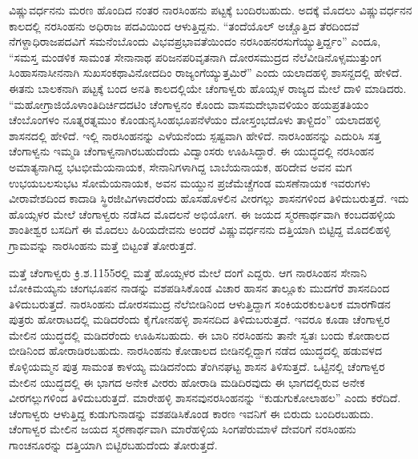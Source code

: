 ವಿಷ್ಣುವರ್ಧನನು ಮರಣ ಹೊಂದಿದ ನಂತರ ನಾರಸಿಂಹನು ಪಟ್ಟಕ್ಕೆ ಬಂದಿರಬಹುದು. ಅದಕ್ಕೆ ಮೊದಲು ವಿಷ್ಣುವರ್ಧನನ ಕಾಲದಲ್ಲಿ ನರಸಿಂಹನು ಅಧಿರಾಜ ಪದವಿಯಿಂದ ಆಳುತ್ತಿದ್ದನು. “ತಂದೆಯೊಲ್​ ಅಚ್ಚೊತ್ತಿದ ತೆರದಿಂದವೆ ನೆಗಳ್ದಾಧಿರಾಜಪದವಿಗೆ ಸಮನೆಂಬೊಂದು ವಿಭವಪ್ರಭಾವತೆಯಿಂದಂ ನರಸಿಂಹನರಸುಗೆಯ್ಯುತ್ತಿರ್ದ್ದಂ” ಎಂದೂ, “ಸಮಸ್ತ ಮಂಡಳಿಕ ಸಾಮಂತ ಸೇನಾನಾಥ ಪರಿಜನಪರಿವೃತನಾಗಿ ದೋರಸಮುದ್ರದ ನೆಲೆವೀಡಿನೊಳ್ಸಮುತ್ತುಂಗ ಸಿಂಹಾಸನಾಸೀನನಾಗಿ ಸುಖಸಂಕಥಾ\break ವಿನೋದದಿಂ ರಾಜ್ಯಂಗೆಯ್ಯುತ್ತಮಿರೆ” ಎಂದು ಯಲಾದಹಳ್ಳಿ ಶಾಸನ್ದದಲ್ಲಿ ಹೇಳಿದೆ. ಈತನು ಬಾಲಕನಾಗಿ ಪಟ್ಟಕ್ಕೆ ಬಂದ ಅನತಿ ಕಾಲದಲ್ಲಿಯೇ ಚೆಂಗಾಳ್ವರು ಹೊಯ್ಸಳ ರಾಜ್ಯದ ಮೇಲೆ ದಾಳಿ ಮಾಡಿದರು. “ಮಹೋಗ್ರಾಜಿಯೊಳಾಂತಿದಿರ್ಚಿದದಟಿಂ ಚೆಂಗಾಳ್ವನಂ ಕೊಂದು ವಾಸಮದೇಭಾವಳಿಯಂ ಹಯಪ್ರತತಿಯಂ ಚೆಂಬೊಂಗಳಂ ನೂತ್ನರತ್ನಮುಂ ಕೊಂಡು\break ನೃಸಿಂಹಭೂಪನೆಳೆಯಂ ದೋಸ್ತಂಭದೊಳು ತಾಳ್ದಿದಂ” ಯಲಾದಹಳ್ಳಿ ಶಾಸನದಲ್ಲಿ ಹೇಳಿದೆ. ಇಲ್ಲಿ ನಾರಸಿಂಹನನ್ನು ಎಳೆಯನೆಂದು ಸ್ಪಷ್ಟವಾಗಿ ಹೇಳಿದೆ. ನಾರಸಿಂಹನನ್ನು ಎದುರಿಸಿ ಸತ್ತ ಚೆಂಗಾಳ್ವನು ಇಮ್ಮಡಿ ಚೆಂಗಾಳ್ವನಾಗಿರಬಹುದೆಂದು ವಿದ್ವಾಂಸರು ಊಹಿಸಿದ್ದಾರೆ. ಈ ಯುದ್ಧದಲ್ಲಿ ನರಸಿಂಹನ ಅಮಾತ್ಯನಾಗಿದ್ದ ಭಟಭೀಮೆಯನಾಯಕ, ಸೇನಾನಿಗಳಾಗಿದ್ದ ಬಾಬೆಯನಾಯಕ, ಹರಿದೇವ ಅವನ ಮಗ ಉಭಯಬಲಸುಭಟ ಸೋಮೆಯನಾಯಕ, ಅವನ ಮಯ್ದುನ ಪ್ರಜೆಮೆಚ್ಚೆಗಂಡ ಮಸಣೆನಾಯಕ ಇವರುಗಳು ವೀರಾವೇಶದಿಂದ ಕಾದಾಡಿ ಸ್ಥಿರಜೀವಿಗಳಾದರೆಂದು ಹೊಸಹೊಳಲಿನ ವೀರಗಲ್ಲು ಶಾಸನಗಳಿಂದ ತಿಳಿದುಬರುತ್ತದೆ. ಇದು ಹೊಯ್ಸಳರ ಮೇಲೆ ಚೆಂಗಾಳ್ವರು ನಡೆಸಿದ ಮೊದಲನೆ ಅಭಿಯೋಗ. ಈ ಜಯದ ಸ್ಮರಣಾರ್ಥವಾಗಿ ಕಂಬದಹಳ್ಳಿಯ ಶಾಂತೀಶ್ವರ ಬಸದಿಗೆ ಈ ಮೊದಲು ಹಿರಿಯದೇವನು ಅಂದರೆ ವಿಷ್ಣುವರ್ಧನನು ದತ್ತಿಯಾಗಿ ಬಿಟ್ಟಿದ್ದ ಮೊದಲಿಹಳ್ಳಿ ಗ್ರಾಮವನ್ನು ನಾರಸಿಂಹನು ಮತ್ತೆ ಬಿಟ್ಟಂತೆ ತೋರುತ್ತದೆ. 

ಮತ್ತೆ ಚೆಂಗಾಳ್ವರು ಕ್ರಿ.ಶ.1155ರಲ್ಲಿ ಮತ್ತೆ ಹೊಯ್ಸಳರ ಮೇಲೆ ದಂಗೆ ಎದ್ದರು. ಆಗ ನಾರಸಿಂಹನ ಸೇನಾನಿ ಬೋಕಿಮಯ್ಯನು ಚಂಗಭೂಪನ ನಾಡನ್ನು ವಶಪಡಿಸಿಕೊಂಡ ವಿಚಾರ ಹಾಸನ ತಾಲ್ಲೂಕು ಮುದಗೆರೆ ಶಾಸನದಿಂದ ತಿಳಿದುಬರುತ್ತದೆ. ನಾರಸಿಂಹನು ದೋರಸಮುದ್ರ ನೆಲೆಬೀಡಿನಿಂದ ಆಳುತ್ತಿದ್ದಾಗ ಸಂಕಿಯರಕುಲತಿಲಕ ಮಾರಗೌಡನ ಪುತ್ರರು ಹೋರಾಟದಲ್ಲಿ ಮಡಿದರೆಂದು ಕೈಗೋನಹಳ್ಳಿ ಶಾಸನದಿದ ತಿಳಿದುಬರುತ್ತದೆ. ಇವರೂ ಕೂಡಾ ಚೆಂಗಾಳ್ವರ ಮೇಲಿನ ಯುದ್ಧದಲ್ಲಿ ಮಡಿದರೆಂದು ಊಹಿಸಬಹುದು. ಈ ಬಾರಿ ನರಸಿಂಹನು ತಾನೇ ಸ್ವತಃ ಬಂದು ಕೋಡಾಲದ ಬೀಡಿನಿಂದ ಹೋರಾಡಿರಬಹುದು. ನಾರಸಿಂಹನು ಕೋಡಾಲದ ಬೀಡಿನಲ್ಲಿದ್ದಾಗ ನಡೆದ ಯುದ್ಧದಲ್ಲಿ ಹಡುವಳದ ಕೊಳ್ಳಿಯಮ್ಮನ ಪುತ್ರ ಸಾಮಂತ ಕಾಳಯ್ಯ ಮಡಿದನೆಂದು ತೆಂಗಿನಘಟ್ಟ ಶಾಸನ ತಿಳಿಸುತ್ತದೆ. ಒಟ್ಟಿನಲ್ಲಿ ಚೆಂಗಾಳ್ವರ ಮೇಲಿನ ಯುದ್ಧದಲ್ಲಿ ಈ ಭಾಗದ ಅನೇಕ ವೀರರು ಹೋರಾಡಿ ಮಡಿದಿರವುದು ಈ ಭಾಗದಲ್ಲಿರುವ ಅನೇಕ ವೀರಗಲ್ಲುಗಳಿಂದ ತಿಳಿದುಬರುತ್ತದೆ. ಮಾರೇಹಳ್ಳಿ ಶಾಸನವುನರಸಿಂಹನನ್ನು “ಕುಡುಗುಕೋಲಾಹಲ” ಎಂದು ಕರೆದಿದೆ. ಚೆಂಗಾಳ್ವರು ಆಳುತ್ತಿದ್ದ ಕುಡುಗುನಾಡನ್ನು ವಶಪಡಿಸಿಕೊಂಡ ಕಾರಣ ಇವನಿಗೆ ಈ ಬಿರುದು ಬಂದಿರಬಹುದು. ಚೆಂಗಾಳ್ವರ ಮೇಲಿನ ಜಯದ ಸ್ಮರಣಾರ್ಥವಾಗಿ ಮಾರೆಹಳ್ಳಿಯ ಸಿಂಗಪೆರುಮಾಳೆ ದೇವರಿಗೆ ನರಸಿಂಹನು ಗಾಂಚನೂರನ್ನು ದತ್ತಿಯಾಗಿ ಬಿಟ್ಟಿರಬಹುದೆಂದು ತೋರುತ್ತದೆ. 

